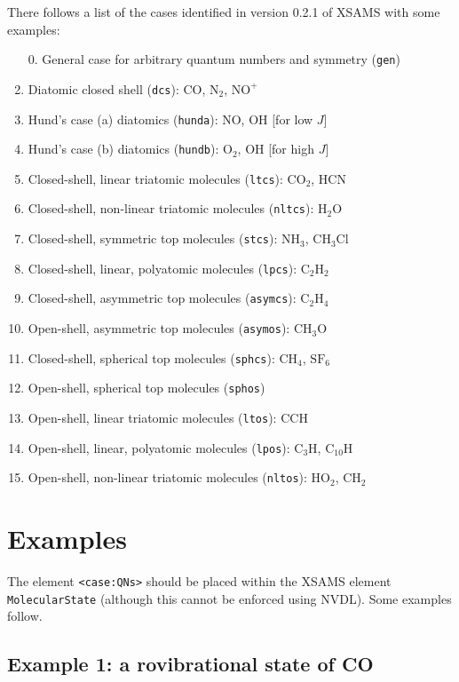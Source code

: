 \documentclass[a4paper]{article} \pagestyle{plain}
\begin{document}
There follows a list of the cases identified in version 0.2.1 of XSAMS with some examples:

\begin{enumerate}
\item[0.] General case for arbitrary quantum numbers and symmetry (\texttt{gen})
\item Diatomic closed shell (\texttt{dcs}): CO, $\mathrm{N_2}$, $\mathrm{NO^+}$
\item Hund's case (a) diatomics (\texttt{hunda}): NO, OH [for low $J$]
\item Hund's case (b) diatomics (\texttt{hundb}): $\mathrm{O_2}$, OH [for high $J$]
\item Closed-shell, linear triatomic molecules (\texttt{ltcs}): $\mathrm{CO_2}$, HCN
\item Closed-shell, non-linear triatomic molecules (\texttt{nltcs}): $\mathrm{H_2O}$
\item Closed-shell, symmetric top molecules (\texttt{stcs}): $\mathrm{NH_3}$, $\mathrm{CH_3Cl}$
\item Closed-shell, linear, polyatomic molecules (\texttt{lpcs}): $\mathrm{C_2H_2}$
\item Closed-shell, asymmetric top molecules (\texttt{asymcs}): $\mathrm{C_2H_4}$
\item Open-shell, asymmetric top molecules (\texttt{asymos}): $\mathrm{CH_3O}$
\item Closed-shell, spherical top molecules (\texttt{sphcs}): $\mathrm{CH_4}$, $\mathrm{SF_6}$
\item Open-shell, spherical top molecules (\texttt{sphos})
\item Open-shell, linear triatomic molecules (\texttt{ltos}): $\mathrm{CCH}$
\item Open-shell, linear, polyatomic molecules (\texttt{lpos}): $\mathrm{C_3H}$, $\mathrm{C_{10}H}$
\item Open-shell, non-linear triatomic molecules (\texttt{nltos}): $\mathrm{HO_2}$, $\mathrm{CH_2}$
\end{enumerate}

\section*{Examples}
The element \texttt{<case:QNs>} should be placed within the XSAMS element \texttt{MolecularState} (although this cannot be enforced using NVDL). Some examples follow.

\subsection*{Example 1: a rovibrational state of CO}
\end{document}
